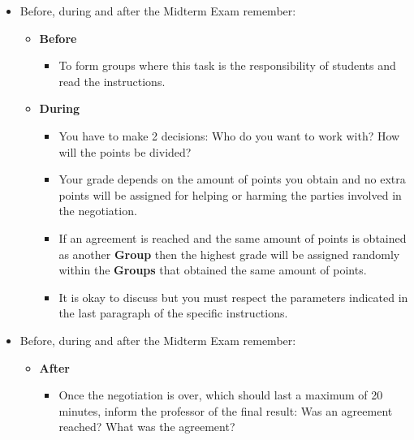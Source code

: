 \documentclass[
  ignorenonframetext,
]{beamer}
\providecommand{\tightlist}{%
  \setlength{\itemsep}{0pt}\setlength{\parskip}{0pt}}\usepackage{longtable,booktabs,array}
\begin{document}
\begin{frame}{}
\label{section-9}
\begin{itemize}
\item
  Before, during and after the Midterm Exam remember:

  \begin{itemize}
  \item
    \textbf{Before}

    \begin{itemize}
    \tightlist
    \item
      To form groups where this task is the responsibility of students
      and read the instructions.
    \end{itemize}
  \item
    \textbf{During}

    \begin{itemize}
    \tightlist
    \item
      You have to make 2 decisions: Who do you want to work with? How
      will the points be divided?
    \item
      Your grade depends on the amount of points you obtain and no extra
      points will be assigned for helping or harming the parties
      involved in the negotiation.
    \item
      If an agreement is reached and the same amount of points is
      obtained as another \textbf{Group} then the highest grade will be
      assigned randomly within the \textbf{Groups} that obtained the
      same amount of points.
    \item
      It is okay to discuss but you must respect the parameters
      indicated in the last paragraph of the specific instructions.
    \end{itemize}
  \end{itemize}
\end{itemize}
\end{frame}

\begin{frame}{}
\label{section-10}
\begin{itemize}
\item
  Before, during and after the Midterm Exam remember:

  \begin{itemize}
  \item
    \textbf{After}

    \begin{itemize}
    \tightlist
    \item
      Once the negotiation is over, which should last a maximum of 20
      minutes, inform the professor of the final result: Was an
      agreement reached? What was the agreement?
    \end{itemize}
  \end{itemize}
\end{itemize}
\end{frame}
\end{document}
